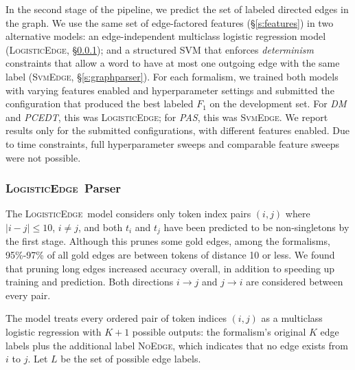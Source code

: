 \documentclass[11pt]{article}
\newcommand{\jmf}[1]{\textcolor{orange}{[#1 -JMF]}}
\renewcommand{\jmf}[1]{}
\newcommand{\codenote}[1]{}
\newcommand{\logitedge}{\textsc{LogisticEdge}}
\newcommand{\svmedge}{\textsc{SvmEdge}}
\newcommand{\noedge}{\textsc{NoEdge}}
\begin{document}
In the second stage of the pipeline, we predict the set of labeled directed
edges in the graph.
We use the same set of edge-factored features (\S\ref{s:features}) in two
alternative models: an edge-independent multiclass logistic
regression model (\logitedge, \S\ref{s:logitedge}); and a structured SVM 
\cite{taskar_max_2003,tsochantaridis_support_2004} that enforces 
\emph{determinism}\jmf{I'll find a citation} constraints that allow a word to
have at most one outgoing edge with the
same label (\svmedge, \S\ref{s:graphparser}).
For each formalism, we trained both models with varying features enabled and
hyperparameter settings and submitted the configuration that produced the best
labeled $F_1$ on the development set.
For \emph{DM} and \emph{PCEDT}, this was \logitedge;
for \emph{PAS}, this was \svmedge.
We report results only for the submitted configurations, with different features
enabled.
Due to time constraints, full hyperparameter sweeps and comparable feature sweeps were not possible.


\subsubsection{\logitedge\ Parser}
\label{s:logitedge}


\codenote{LRParser.java}

The \logitedge\ model considers only token index pairs $(i, j)$ where %
$|i-j| \leq 10$, $i \ne j$, and both $t_i$ and
$t_j$ have been predicted to be non-singletons by the first stage.
Although this prunes some gold edges, among the formalisms,
95\%-97\% of all gold edges are between tokens of distance 10 or less.
We found that pruning long edges increased accuracy overall, in addition to
speeding up training and prediction.
Both directions $i \rightarrow j$ and $j \rightarrow
i$ are considered between every pair.

The model treats every ordered pair of token indices $(i, j)$ as a
multiclass logistic regression with $K+1$ possible outputs:
the formalism's original $K$ edge labels plus the additional label \noedge,
which indicates that no edge exists from $i$ to $j$.
Let $L$ be the set of possible edge labels.
\end{document}
